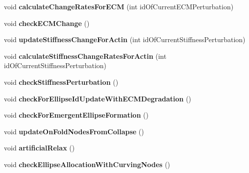 \begin{DoxyCompactItemize}
\item 
\hypertarget{classSimulation_a405e565b21064979e0010286927d087a}{}void {\bfseries calculate\+Change\+Rates\+For\+E\+C\+M} (int id\+Of\+Current\+E\+C\+M\+Perturbation)\label{classSimulation_a405e565b21064979e0010286927d087a}

\item 
\hypertarget{classSimulation_ae096c8a7fcc6e921415d1be317526d02}{}void {\bfseries check\+E\+C\+M\+Change} ()\label{classSimulation_ae096c8a7fcc6e921415d1be317526d02}

\item 
\hypertarget{classSimulation_aacaebdb527784f46f67232f3180936e1}{}void {\bfseries update\+Stiffness\+Change\+For\+Actin} (int id\+Of\+Current\+Stiffness\+Perturbation)\label{classSimulation_aacaebdb527784f46f67232f3180936e1}

\item 
\hypertarget{classSimulation_a8b40b6f71c115d9c566333151219a7d6}{}void {\bfseries calculate\+Stiffness\+Change\+Rates\+For\+Actin} (int id\+Of\+Current\+Stiffness\+Perturbation)\label{classSimulation_a8b40b6f71c115d9c566333151219a7d6}

\item 
\hypertarget{classSimulation_a361530c38e215fd901d5e8a0ef051386}{}void {\bfseries check\+Stiffness\+Perturbation} ()\label{classSimulation_a361530c38e215fd901d5e8a0ef051386}

\item 
\hypertarget{classSimulation_aba7aa0ded1d2cd262ed08c8abddde4f8}{}void {\bfseries check\+For\+Ellipse\+Id\+Update\+With\+E\+C\+M\+Degradation} ()\label{classSimulation_aba7aa0ded1d2cd262ed08c8abddde4f8}

\item 
\hypertarget{classSimulation_a49ebb11d5727f0a6fc3ebfe8166b7290}{}void {\bfseries check\+For\+Emergent\+Ellipse\+Formation} ()\label{classSimulation_a49ebb11d5727f0a6fc3ebfe8166b7290}

\item 
\hypertarget{classSimulation_ae7642cf5d56f38710da9b219e56b3c77}{}void {\bfseries update\+On\+Fold\+Nodes\+From\+Collapse} ()\label{classSimulation_ae7642cf5d56f38710da9b219e56b3c77}

\item 
\hypertarget{classSimulation_aee92b20e497b42f5b7a089c3f9409e97}{}void {\bfseries artificial\+Relax} ()\label{classSimulation_aee92b20e497b42f5b7a089c3f9409e97}

\item 
\hypertarget{classSimulation_a1cf2aca93cb0f8716817936d98b6bf0e}{}void {\bfseries check\+Ellipse\+Allocation\+With\+Curving\+Nodes} ()\label{classSimulation_a1cf2aca93cb0f8716817936d98b6bf0e}


\end{DoxyCompactItemize}
